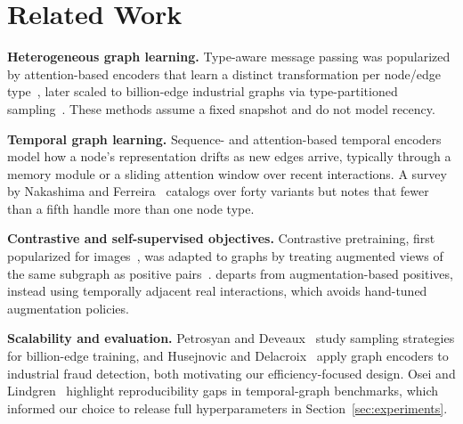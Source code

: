 \section{Related Work}
\label{sec:related}
\textbf{Heterogeneous graph learning.} Type-aware message passing was
popularized by attention-based encoders that learn a distinct transformation
per node/edge type~\cite{tesfaye2019han}, later scaled to
billion-edge industrial graphs via type-partitioned
sampling~\cite{oyelaran2023heterogeneous}. These methods assume a fixed
snapshot and do not model recency.

\textbf{Temporal graph learning.} Sequence- and attention-based temporal
encoders~\cite{brandt2022temporal,marceau2021dysat} model how a node's
representation drifts as new edges arrive, typically through a memory
module or a sliding attention window over recent interactions. A survey by
Nakashima and Ferreira~\cite{nakashima2021survey} catalogs over forty
variants but notes that fewer than a fifth handle more than one node type.

\textbf{Contrastive and self-supervised objectives.} Contrastive
pretraining, first popularized for images~\cite{yamazaki2021simclr}, was
adapted to graphs by treating augmented views of the same subgraph as
positive pairs~\cite{alavi2020contrastive}. \sysname{} departs from
augmentation-based positives, instead using temporally adjacent real
interactions, which avoids hand-tuned augmentation policies.

\textbf{Scalability and evaluation.} Petrosyan and
Deveaux~\cite{petrosyan2022scalable} study sampling strategies for
billion-edge training, and Husejnovic and
Delacroix~\cite{husejnovic2020fraud} apply graph encoders to industrial
fraud detection, both motivating our efficiency-focused design. Osei and
Lindgren~\cite{osei2022benchmark} highlight reproducibility gaps in
temporal-graph benchmarks, which informed our choice to release full
hyperparameters in Section~\ref{sec:experiments}.
